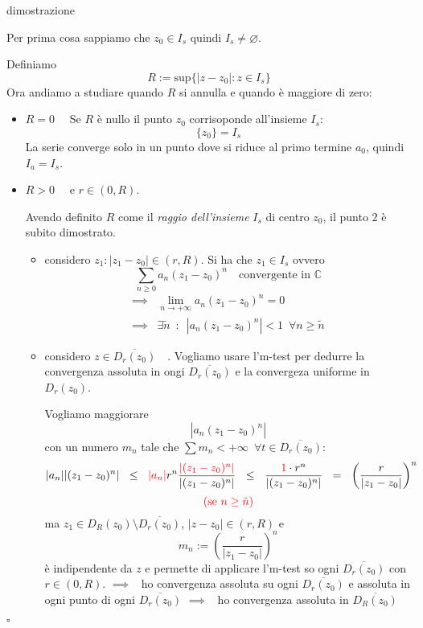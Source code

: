 \documentclass[x11names]{article}
\newcommand*{\QEDB}{\null\nobreak\hfill\ensuremath{\square}}%
\newcommand{\dimostrazione}[2]{
	\begin{dym}{dimostrazione#1}
		#2
		\QEDB
	\end{dym}
}
\begin{document}
\dimostrazione{}{
Per prima cosa sappiamo che \(z_{0} \in I_{s}\) quindi \(I_{s} \neq \varnothing\).

Definiamo 
\[ 
R := \text{sup}\{|z-z_{0}| : z \in I_{s}\}
\]
Ora andiamo a studiare quando \(R\) si annulla e quando è maggiore di zero:
\begin{itemize}
	\item \(\boxed{R = 0} \quad\) Se \(R\) è nullo il punto \(z_{0}\) corrisoponde all'insieme \(I_{s}\): 
	\[ 
	\{z_{0}\} = I_{s}
	\]
	La serie converge solo in un punto dove si riduce al primo termine \(a_{0}\), quindi \(I_{a} = I_{s}\).
	\item \(\boxed{R > 0} \quad\) e \(r \in (0,R)\).
	
	Avendo definito \(R\) come il \textit{raggio dell'insieme} \(I_{s}\) di centro \(z_{0}\), il punto \(2\) è subito dimostrato.
	
	\begin{itemize}
		\item considero \(\boxed{z_{1}:|z_{1} - z_{0}| \in (r,R)}\). Si ha che \(z_{1} \in I_{s}\) ovvero
		\[ 
		\sum_{n\geq 0} a_{n}(z_{1}-z_{0})^n \quad \text{convergente in } \mathbb{C}
		\]
		\begin{align*}
			\implies& \lim_{n\to +\infty}a_{n}(z_{1}-z_{0})^n = 0 \\ 
			\implies& \exists\tilde{n} \;\ : \;\ |a_{n}(z_{1}-z_{0})^n| < 1 \;\ \forall n \geq \tilde{n}
		\end{align*}
		
		\item considero \(\boxed{z \in \overline{D_{r}(z_{0})}} \quad\). Vogliamo usare l'm-test per dedurre la convergenza assoluta in ongi \(\overline{D_{r}(z_{0})}\) e la convergeza uniforme in \(D_{r}(z_{0})\).
		
		Vogliamo maggiorare
		\[ 
		|a_{n}(z_{1}-z_{0})^n|
		\]
		con un numero \(m_{n}\) tale che \(\sum m_{n} < +\infty \;\ \forall t \in \overline{D_{r}(z_{0})}\):
		\[ 
		|a_{n}||(z_{1}-z_{0})^n| \;\ \leq \;\ \textcolor{red}{|a_{n}|}r^n\frac{\textcolor{red}{|(z_{1}-z_{0})^n|}}{|(z_{1}-z_{0})^n|}\;\ \leq \;\ \frac{\textcolor{red}{1}\cdot r^n}{|(z_{1}-z_{0})^n|} \;\ = \;\ \left(\frac{r}{|z_{1}-z_{0}|}\right)^n  
		\]
		\[
		\textcolor{red}{(\text{se }n \geq \tilde{n})}
		\]
		ma \(z_1 \in D_R(z_0) \setminus \overline{D_r(z_0)}\), \(|z-z_0| \in (r,R)\) e 
		\[
		m_n := \left(\frac{r}{|z_{1}-z_{0}|}\right)^n  
		\]
		è indipendente da \(z\) e permette di applicare l'm-test so ogni \(\overline{D_r(z_0)}\) con \(r\in (0,R)\).
		\(\implies \;\ \) ho convergenza assoluta su ogni  \(\overline{D_r(z_0)}\) e assoluta in ogni punto di ogni  \(\overline{D_r(z_0)}\) \(\implies \;\ \) ho convergenza assoluta in \(\overline{D_R(z_0)}\)
	\end{itemize}
\end{itemize}
}
\end{document}
